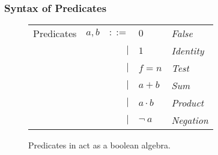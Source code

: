 \documentclass[sigconf,usenames,dvipsnames,svgnames,table]{acmart}
\begin{document}
      \subsubsection{Syntax of Predicates}\label{sec:spec:synt:pred}
        \begin{figure}
          \centering
          \begin{tabular}{l c r l l}
            Predicates  & $a,b$ & $::=$  & $0$          & \textit{False}    \\
                        &       & $\mid$ & $1$          & \textit{Identity} \\
                        &       & $\mid$ & $f = n$      & \textit{Test}     \\
                        &       & $\mid$ & $a + b$      & \textit{Sum}      \\
                        &       & $\mid$ & $a \cdot b$  & \textit{Product}  \\
                        &       & $\mid$ & $\neg\ a$    & \textit{Negation}
          \end{tabular}
          \caption{Predicates in \sysname act as a boolean algebra.}
          \label{fig:spec:synt:pred}
        \end{figure}

\end{document}
